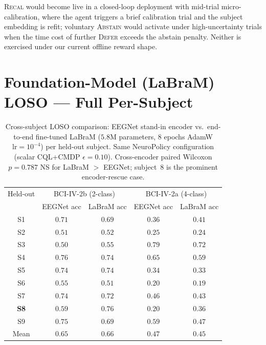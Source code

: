 \documentclass[conference]{IEEEtran}
\newcommand{\nettype}{NeuroPolicy}
\newcommand{\bcia}{BCI-IV-2a}
\newcommand{\bcib}{BCI-IV-2b}
\newcommand{\labram}{LaBraM}
\newcommand{\eegnet}{EEGNet}
\newcommand{\cql}{CQL}
\begin{document}
\textsc{Recal} would become live in a closed-loop deployment with
mid-trial micro-calibration, where the agent triggers a brief
calibration trial and the subject embedding is refit; voluntary
\textsc{Abstain} would activate under high-uncertainty trials when
the time cost of further \textsc{Defer} exceeds the abstain
penalty. Neither is exercised under our current offline reward
shape.

\section{Foundation-Model (LaBraM) LOSO --- Full Per-Subject}

\begin{table}[h]
\centering
\caption{Cross-subject LOSO comparison: \eegnet{} stand-in
encoder vs.\ end-to-end fine-tuned \labram{} ($5.8$M parameters,
8 epochs AdamW $\text{lr}\!=\!10^{-4}$) per held-out subject. Same
\nettype{} configuration (scalar \cql{}+CMDP
$\epsilon\!=\!0.10$). Cross-encoder paired Wilcoxon
$p\!=\!0.787$ NS for \labram{} $>$ \eegnet{}; subject~8 is the
prominent encoder-rescue case.}
\label{tab:sup:labram_loso}
\footnotesize
\begin{tabular}{c c c c c}
\toprule
Held-out & \multicolumn{2}{c}{\bcib{} (2-class)} & \multicolumn{2}{c}{\bcia{} (4-class)} \\
         & \eegnet{} acc & \labram{} acc & \eegnet{} acc & \labram{} acc \\
\midrule
S1 & $0.71$ & $0.69$ & $0.36$ & $0.41$ \\
S2 & $0.51$ & $0.52$ & $0.25$ & $0.24$ \\
S3 & $0.50$ & $0.55$ & $0.79$ & $0.72$ \\
S4 & $0.76$ & $0.74$ & $0.65$ & $0.59$ \\
S5 & $0.74$ & $0.74$ & $0.34$ & $0.33$ \\
S6 & $0.55$ & $0.51$ & $0.20$ & $0.19$ \\
S7 & $0.74$ & $0.72$ & $0.46$ & $0.43$ \\
\textbf{S8} & $0.59$ & $\mathbf{0.76}$ & $0.20$ & $\mathbf{0.36}$ \\
S9 & $0.75$ & $0.69$ & $0.59$ & $0.47$ \\
\midrule
Mean & $0.65$ & $0.66$ & $0.47$ & $0.45$ \\
\bottomrule
\end{tabular}
\end{table}
\end{document}
